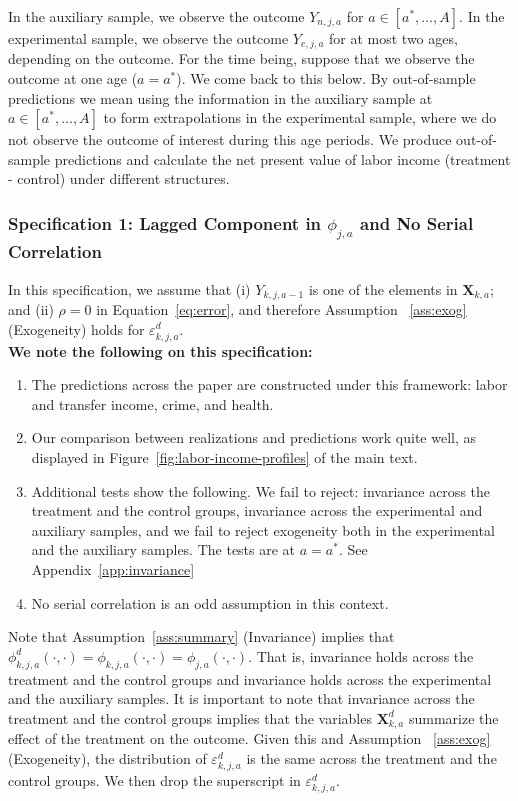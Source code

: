 \noindent In the auxiliary sample, we observe the outcome $Y_{n,j,a}$ for $a \in [a^*, \ldots, A]$. In the experimental sample, we observe the outcome $Y_{e,j,a}$ for at most two ages, depending on the outcome. For the time being, suppose that we observe the outcome at one age ($a = a^*$). We come back to this below. By out-of-sample predictions we mean using the information in the auxiliary sample at  $a \in [a^*, \ldots, A]$ to form extrapolations in the experimental sample, where we do not observe the outcome of interest during this age periods. We produce out-of-sample predictions and calculate the net present value of labor income (treatment - control) under different structures.\\ 

\subsubsection{Specification 1: Lagged Component in $\phi_{j,a}$ and No Serial Correlation} \label{app:spec1}

\noindent In this specification, we assume that (i)  $Y_{k,j,a-1}$ is one of the elements in $\bm{X}_{k,a}$; and (ii) $\rho = 0$ in Equation~\eqref{eq:error}, and therefore Assumption ~\ref{ass:exog} (Exogeneity) holds for $\varepsilon_{k,j,a}^d$.\\

\noindent \textbf{We note the following on this specification:}

\begin{enumerate}
 
\item The predictions across the paper are constructed under this framework: labor and transfer income, crime, and health. 
\item Our comparison between realizations and predictions work quite well, as displayed in Figure~\ref{fig:labor-income-profiles} of the main text. 
\item Additional tests show the following. We fail to reject: invariance across the treatment and the control groups, invariance across the experimental and auxiliary samples, and we fail to reject exogeneity both in the experimental and the auxiliary samples.  The tests are at $a = a^*$. See Appendix~\ref{app:invariance}
\item No serial correlation is an odd assumption in this context.
\end{enumerate}

\noindent Note that Assumption~\ref{ass:summary} (Invariance) implies that $\phi_{k,j,a}^d \left (\cdot, \cdot \right) = \phi_{k,j,a}  \left (\cdot, \cdot \right) = \phi_{j,a}  \left (\cdot, \cdot \right)$. That is, invariance holds across the treatment and the control groups and invariance holds across the experimental and the auxiliary samples. It is important to note that invariance across the treatment and the control groups implies that the variables $\bm{X}_{k,a}^d$ summarize the effect of the treatment on the outcome. Given this and Assumption ~\ref{ass:exog} (Exogeneity), the distribution of $\varepsilon_{k,j,a}^d$ is the same across the treatment and the control groups. We then drop the superscript in $\varepsilon_{k,j,a}^d$.\\ 

